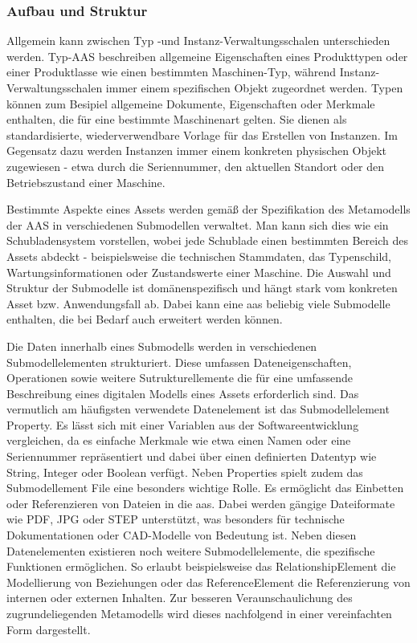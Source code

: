 \subsubsection{Aufbau und Struktur}
Allgemein kann zwischen Typ -und Instanz-Verwaltungsschalen unterschieden werden.
Typ-AAS beschreiben allgemeine Eigenschaften eines Produkttypen oder einer Produktlasse wie einen bestimmten Maschinen-Typ, während Instanz-Verwaltungsschalen immer einem spezifischen Objekt zugeordnet werden.
Typen können zum Besipiel allgemeine Dokumente, Eigenschaften oder Merkmale enthalten, die für eine bestimmte Maschinenart gelten.
Sie dienen als standardisierte, wiederverwendbare Vorlage für das Erstellen von Instanzen.
Im Gegensatz dazu werden Instanzen immer einem konkreten physischen Objekt zugewiesen - etwa durch die Seriennummer, den aktuellen Standort oder den Betriebszustand einer Maschine.

Bestimmte Aspekte eines Assets werden gemäß der Spezifikation des Metamodells der AAS \cite{SpezifikationPart1} in verschiedenen Submodellen verwaltet.
Man kann sich dies wie ein Schubladensystem vorstellen, wobei jede Schublade einen bestimmten Bereich des Assets abdeckt - beispielsweise die technischen Stammdaten, das Typenschild, Wartungsinformationen oder Zustandswerte einer Maschine.
Die Auswahl und Struktur der Submodelle ist domänenspezifisch und hängt stark vom konkreten Asset bzw. Anwendungsfall ab. 
Dabei kann eine \acs{aas} beliebig viele Submodelle enthalten, die bei Bedarf auch erweitert werden können. 

Die Daten innerhalb eines Submodells werden in verschiedenen Submodellelementen strukturiert.
Diese umfassen Dateneigenschaften, Operationen sowie weitere Sutrukturellemente die für eine umfassende Beschreibung eines digitalen Modells eines Assets erforderlich sind.
Das vermutlich am häufigsten verwendete Datenelement ist das Submodellelement Property.
Es lässt sich mit einer Variablen aus der Softwareentwicklung vergleichen, da es einfache Merkmale wie etwa einen Namen oder eine Seriennummer repräsentiert und dabei über einen definierten Datentyp wie String, Integer oder Boolean verfügt.
Neben Properties spielt zudem das Submodellement File eine besonders wichtige Rolle. Es ermöglicht das Einbetten oder Referenzieren von Dateien in die \acs{aas}. 
Dabei werden gängige Dateiformate wie PDF, JPG oder STEP unterstützt, was besonders für technische Dokumentationen oder CAD-Modelle von Bedeutung ist.
Neben diesen Datenelementen existieren noch weitere Submodellelemente, die spezifische Funktionen ermöglichen. 
So erlaubt beispielsweise das RelationshipElement die Modellierung von Beziehungen oder das ReferenceElement die Referenzierung von internen oder externen Inhalten.
Zur besseren Veraunschaulichung des zugrundeliegenden Metamodells wird dieses nachfolgend in einer vereinfachten Form dargestellt.



